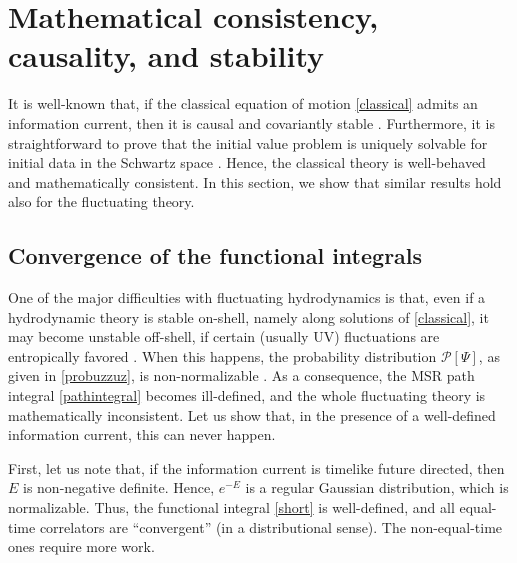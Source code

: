 \documentclass[a4paper, amsfonts, amssymb, amsmath, reprint, showkeys, nofootinbib, twoside,notitlepage,onecolumn]{revtex4-2}
\theoremstyle{definition}
\begin{document}
\section{Mathematical consistency, causality, and stability}\label{theBestoBoss}

It is well-known that, if the classical equation of motion \eqref{classical} admits an information current, then it is causal and covariantly stable \cite{GavassinoGibbs2021,GavassinoCausality2021}. Furthermore, it is straightforward to prove that the initial value problem is uniquely solvable for initial data in the Schwartz space \cite{Hishcock1983,GavassinoUniversality2023}. Hence, the classical theory is well-behaved and mathematically consistent. In this section, we show that similar results hold also for the fluctuating theory. 

\subsection{Convergence of the functional integrals}

One of the major difficulties with fluctuating hydrodynamics is that, even if a hydrodynamic theory is stable on-shell, namely along solutions of \eqref{classical}, it may become unstable off-shell, if certain (usually UV) fluctuations are entropically favored \cite{GavassinoCausality2021}. When this happens, the probability distribution $\mathcal{P}[\Psi]$, as given in \eqref{probuzzuz}, is non-normalizable \cite{Mullins:2023ott}. As a consequence, the MSR path integral \eqref{pathintegral} becomes ill-defined, and the whole fluctuating theory is mathematically inconsistent. Let us show that, in the presence of a well-defined information current, this can never happen.

First, let us note that, if the information current is timelike future directed, then $E$ is non-negative definite. Hence, $e^{-E}$ is a regular Gaussian distribution, which is normalizable. Thus, the functional integral \eqref{short} is well-defined, and all equal-time correlators are ``convergent'' (in a distributional sense). The non-equal-time ones require more work.
\end{document}
